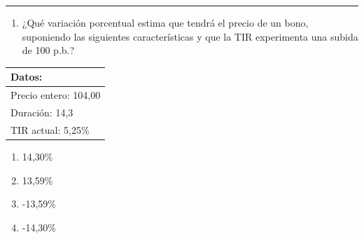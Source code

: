 \documentclass[
  letterpaper,
  DIV=11,
  numbers=noendperiod]{scrartcl}
\providecommand{\tightlist}{%
  \setlength{\itemsep}{0pt}\setlength{\parskip}{0pt}}\usepackage{longtable,booktabs,array}
\begin{document}
\begin{center}\rule{0.5\linewidth}{0.5pt}\end{center}

\begin{enumerate}
\def\labelenumi{\arabic{enumi}.}
\setcounter{enumi}{6}
\tightlist
\item
  ¿Qué variación porcentual estima que tendrá el precio de un bono,
  suponiendo las siguientes características y que la TIR experimenta una
  subida de 100 p.b.?
\end{enumerate}

\begin{longtable}[]{@{}l@{}}
\toprule\noalign{}
\textbf{Datos:} \\
\midrule\noalign{}
\endhead
\bottomrule\noalign{}
\endlastfoot
Precio entero: 104,00 \\
Duración: 14,3 \\
TIR actual: 5,25\% \\
\end{longtable}

\begin{enumerate}
\def\labelenumi{\alph{enumi})}
\item
  14,30\%
\item
  13,59\%
\item
  -13,59\%
\item
  -14,30\%
\end{enumerate}
\end{document}
